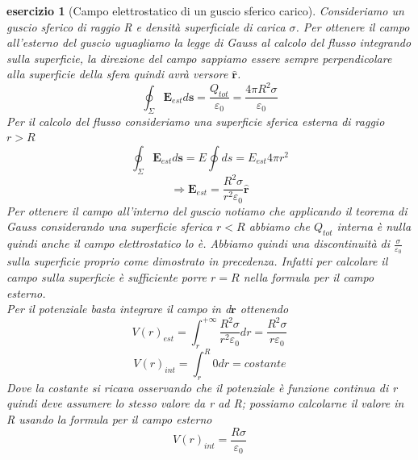\documentclass[10pt,a4paper]{article}
\newtheorem{esercizio}{esercizio}
\begin{document}
\begin{esercizio}[Campo elettrostatico di un guscio sferico carico]
Consideriamo un guscio sferico di raggio R e densità superficiale di carica $\sigma$. Per ottenere il campo all'esterno del guscio uguagliamo la legge di Gauss al calcolo del flusso integrando sulla superficie, la direzione del campo sappiamo essere sempre perpendicolare alla superficie della sfera quindi avrà versore $\hat{\mathbf{r}}$.
\[\oint_{\Sigma}\mathbf{E}_{est}d\mathbf{s} = \frac{Q_{tot}}{\varepsilon_0} = \frac{4\pi R^2 \sigma}{\varepsilon_0}\]
Per il calcolo del flusso consideriamo una superficie sferica esterna di raggio \(r>R\)
\[\oint_{\Sigma}\mathbf{E}_{est}d\mathbf{s} = E\oint ds = E_{est} 4\pi r^2\]
\[\Rightarrow \mathbf{E}_{est} = \frac{R^2 \sigma}{r^2 \varepsilon_0} \hat{\mathbf{r}}\]
Per ottenere il campo all'interno del guscio notiamo che applicando il teorema di Gauss considerando una superficie sferica \(r<R\) abbiamo che \(Q_{tot}\) interna è nulla quindi anche il campo elettrostatico lo è. Abbiamo quindi una discontinuità di $\frac{\sigma}{\varepsilon_0}$ sulla superficie proprio come dimostrato in precedenza. Infatti per calcolare il campo sulla superficie è sufficiente porre \(r=R\) nella formula per il campo esterno.\\
Per il potenziale basta integrare il campo in d$\mathbf{r}$ ottenendo
\[V(r)_{est} = \int_{r}^{+\infty} \frac{R^2 \sigma}{r^2 \varepsilon_0} dr = \frac{R^2 \sigma}{ r\varepsilon_0}\]
\[V(r)_{int} = \int^{R}_r 0 dr = costante \]
Dove la costante si ricava osservando che il potenziale è funzione continua di r quindi deve assumere lo stesso valore da r ad R; possiamo calcolarne il valore in R usando la formula per il campo esterno
\[V(r)_{int} = \frac{R \sigma}{\varepsilon_0}\]
\end{esercizio}
\end{document}
